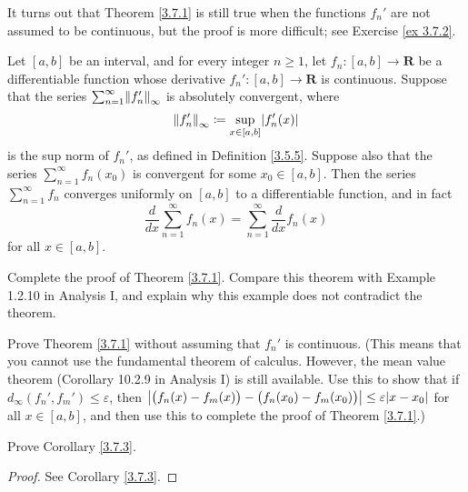 \begin{remark}\label{3.7.2}
    It turns out that Theorem \ref{3.7.1} is still true when the functions \(f_n'\) are not assumed to be continuous, but the proof is more difficult;
    see Exercise \ref{ex 3.7.2}.
\end{remark}

\begin{corollary}\label{3.7.3}
    Let \([a, b]\) be an interval, and for every integer \(n \geq 1\), let \(f_n : [a, b] \to \mathbf{R}\) be a differentiable function whose derivative \(f_n' : [a, b] \to \mathbf{R}\) is continuous.
    Suppose that the series \(\sum_{n = 1}^\infty \norm*{f_n'}_\infty\) is absolutely convergent, where
    \[
        \norm*{f_n'}_\infty \coloneqq \sup_{x \in [a, b]} \abs*{f_n'(x)}
    \]
    is the sup norm of \(f_n'\), as defined in Definition \ref{3.5.5}.
    Suppose also that the series \(\sum_{n = 1}^\infty f_n(x_0)\) is convergent for some \(x_0 \in [a, b]\).
    Then the series \(\sum_{n = 1}^\infty f_n\) converges uniformly on \([a, b]\) to a differentiable function, and in fact
    \[
        \frac{d}{dx} \sum_{n = 1}^\infty f_n(x) = \sum_{n = 1}^\infty \frac{d}{dx} f_n(x)
    \]
    for all \(x \in [a, b]\).
\end{corollary}

\exercisesection

\begin{exercise}\label{ex 3.7.1}
    Complete the proof of Theorem \ref{3.7.1}.
    Compare this theorem with Example 1.2.10 in Analysis I, and explain why this example does not contradict the theorem.
\end{exercise}

\begin{exercise}\label{ex 3.7.2}
    Prove Theorem \ref{3.7.1} without assuming that \(f_n'\) is continuous.
    (This means that you cannot use the fundamental theorem of calculus.
    However, the mean value theorem (Corollary 10.2.9 in Analysis I) is still available.
    Use this to show that if \(d_\infty(f_n', f_m') \leq \varepsilon\), then \(\abs*{\big(f_n(x) - f_m(x)\big) - \big(f_n(x_0) - f_m(x_0)\big)} \leq \varepsilon \abs*{x - x_0}\) for all \(x \in [a, b]\), and then use this to complete the proof of Theorem \ref{3.7.1}.)
\end{exercise}

\begin{exercise}\label{ex 3.7.3}
    Prove Corollary \ref{3.7.3}.
\end{exercise}

\begin{proof}
    See Corollary \ref{3.7.3}.
\end{proof}